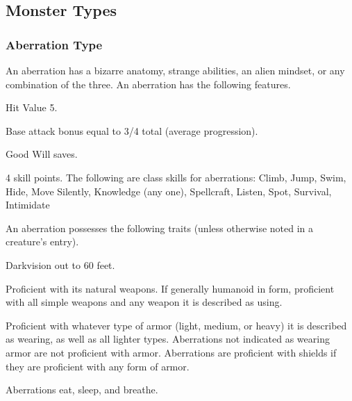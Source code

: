 \subsection{Monster Types}
\subsubsection{Aberration Type} An aberration has a bizarre anatomy, strange abilities, an alien mindset, or any combination of the three.
 An aberration has the following features.
\begin{itemize*}
\item Hit Value 5.
\item Base attack bonus equal to 3/4 total  (average progression).
\item Good Will saves.
\item 4 skill points. The following are class skills for aberrations: Climb, Jump, Swim, Hide, Move Silently, Knowledge (any one), Spellcraft, Listen, Spot, Survival, Intimidate 
\end{itemize*}
 An aberration possesses the following traits (unless otherwise noted in a creature's entry).
\begin{itemize*}
\item Darkvision out to 60 feet.
\item Proficient with its natural weapons. If generally humanoid in form, proficient with all simple weapons and any weapon  it is described as using.
\item Proficient with whatever type of armor (light, medium, or heavy) it is described as wearing, as well as all lighter types. Aberrations not indicated as wearing armor are not proficient with armor. Aberrations are proficient with shields if they are proficient with any form of armor.
\item Aberrations eat, sleep, and breathe.
\end{itemize*}

